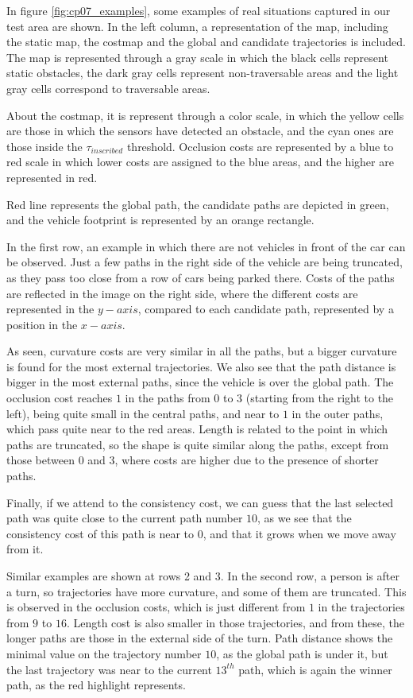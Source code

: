 In figure \ref{fig:cp07_examples}, some examples of real situations captured in our test area are shown. In the left column, a representation of the map, including the static map, the costmap and the global and candidate trajectories is included. The map is represented through a gray scale in which the black cells represent static obstacles, the dark gray cells represent non-traversable areas and the light gray cells correspond to traversable areas.

About the costmap, it is represent through a color scale, in which the yellow cells are those in which the sensors have detected an obstacle, and the cyan ones are those inside the $\tau_{inscribed}$ threshold. Occlusion costs are represented by a blue to red scale in which lower costs are assigned to the blue areas, and the higher are represented in red.

Red line represents the global path, the candidate paths are depicted in green, and the vehicle footprint is represented by an orange rectangle.

In the first row, an example in which there are not vehicles in front of the car can be observed. Just a few paths in the right side of the vehicle are being truncated, as they pass too close from a row of cars being parked there. Costs of the paths are reflected in the image on the right side, where the different costs are represented in the $y-axis$, compared to each candidate path, represented by a position in the $x-axis$. 

As seen, curvature costs are very similar in all the paths, but a bigger curvature is found for the most external trajectories. We also see that the path distance is bigger in the most external paths, since the vehicle is over the global path. The occlusion cost reaches $1$ in the paths from $0$ to $3$ (starting from the right to the left), being quite small in the central paths, and near to $1$ in the outer paths, which pass quite near to the red areas. Length is related to the point in which paths are truncated, so the shape is quite similar along the paths, except from those between $0$ and $3$, where costs are higher due to the presence of shorter paths.

Finally, if we attend to the consistency cost, we can guess that the last selected path was quite close to the current path number $10$, as we see that the consistency cost of this path is near to $0$, and that it grows when we move away from it.

Similar examples are shown at rows 2 and 3. In the second row, a person is after a turn, so trajectories have more curvature, and some of them are truncated. This is observed in the occlusion costs, which is just different from $1$ in the trajectories from $9$ to $16$. Length cost is also smaller in those trajectories, and from these, the longer paths are those in the external side of the turn. Path distance shows the minimal value on the trajectory number $10$, as the global path is under it, but the last trajectory was near to the current $13^{th}$ path, which is again the winner path, as the red highlight represents.


